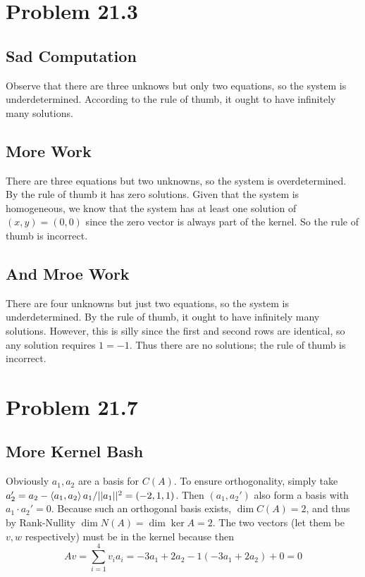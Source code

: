 \documentclass{article}
\theoremstyle{named}
\begin{document}
\section{Problem 21.3}

\subsection{Sad Computation}

Observe that there are three unknows but only two equations, so the system is underdetermined. According to the rule of thumb, it ought to have infinitely many solutions.

\subsection{More Work}

There are three equations but two unknowns, so the system is overdetermined. By the rule of thumb it has zero solutions. Given that the system is homogeneous, we know that the system has at least one solution of $(x, y) = (0, 0)$ since the zero vector is always part of the kernel. So the rule of thumb is incorrect. 

\subsection{And Mroe Work}

There are four unknowns but just two equations, so the system is underdetermined. By the rule of thumb, it ought to have infinitely many solutions. However, this is silly since the first and second rows are identical, so any solution requires $1 = -1$. Thus there are no solutions; the rule of thumb is incorrect. 

\section{Problem 21.7}

\subsection{More Kernel Bash}

Obviously $a_1, a_2$ are a basis for $C(A)$. To ensure orthogonality, simply take $a_2' = a_2 - \braket{a_1, a_2} a_1 / ||a_1||^2 = (-2, 1, 1)$. Then $(a_1, a_2')$ also form a basis with $a_1 \cdot a_2'= 0$. Because such an orthogonal basis exists, $\dim C(A) = 2$, and thus by Rank-Nullity $\dim N(A) = \dim \ker A = 2$. The two vectors (let them be $v, w$ respectively) must be in the kernel because then
\[
    Av = \sum_{i = 1}^4 v_i a_i = -3a_1 + 2a_2 -1(-3a_1 + 2a_2) + 0 = 0
\]
\end{document}
